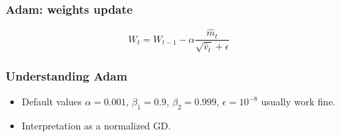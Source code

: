 \begin{frame}
  \frametitle{Adam: weights update}

  \begin{equation}
    W_t = W_{t-1} - \alpha \frac{\hat m_t}{ \sqrt{\hat v_t} + \epsilon}
  \end{equation}

\end{frame}

\begin{frame}
  \frametitle{Understanding Adam}

  \begin{itemize}
    \item Default values $\alpha = 0.001$, $\beta_1 = 0.9$, $\beta_2 = 0.999$, $\epsilon = 10^{-8}$ usually work fine.
    \item Interpretation as a normalized GD. 
  \end{itemize}
  

\end{frame}
